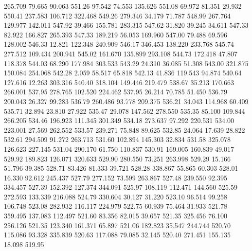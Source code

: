  265.709   79.665   90.063       551.26
  97.542   74.553  135.626       551.08
  69.972   81.351   29.932       550.41
 237.583  106.712  322.468       549.26
 279.346   34.179   71.787       548.99
 267.764  129.977  142.011       547.92
  39.466  155.781  283.315       547.62
  31.820   39.245   34.611       547.33
  82.922  166.827  265.393       547.33
 189.219   56.053  169.960       547.00
  79.488   69.596  128.002       546.33
  12.821  122.348  240.909       546.17
 346.453  138.220  233.768       545.74
 277.512  109.434  200.941       545.02
 161.670  135.899  293.108       544.73
 172.418   47.807  118.378       544.03
  68.290  177.984  303.533       543.29
  24.310   36.085   51.308       543.00
 321.875  150.084  254.068       542.28
   2.059   58.517   65.818       542.13
  41.836  119.543   94.874       540.64
 127.616   12.263  303.316       540.40
 318.104  149.446  219.479       538.67
  35.213  170.663  266.001       537.95
 278.765  102.520  224.462       537.95
  26.214   70.785   51.450       536.79
 200.043   26.327   99.283       536.79
 260.486   93.778  209.375       536.21
  34.043  114.968   60.409       535.71
  32.894   23.810   27.922       535.47
  29.078  147.562  278.550       535.35
  85.100  109.844  266.205       534.46
 196.923  111.345  301.349       534.18
 273.637   97.292  220.531       534.00
 223.001   27.569  262.552       533.57
 239.271   75.848   89.625       532.85
  24.064   17.639   28.822       532.61
 294.509   91.272  263.713       531.60
 102.894  145.303   32.834       531.58
 325.078  126.623  227.145       531.04
 290.170   61.750  110.837       530.91
 169.005  160.839   49.017       529.92
 189.823  126.071  320.633       529.90
 280.550   73.251  263.998       529.29
  15.166   51.796   39.385       528.71
  83.426   81.333   39.721       528.28
 338.867   55.865   60.303       528.01
  16.330   92.612  245.437       527.79
 277.152   73.599  263.867       527.48
 239.550   92.395  334.457       527.39
 152.392  127.374  344.091       525.97
 108.119  112.471  144.560       525.59
 272.593  133.339  216.088       524.79
 330.604   30.127   31.220       523.10
  96.514   99.258  106.748       523.08
 282.932  116.117  224.979       522.75
  60.939   75.464   31.933       521.78
 359.495  137.083  112.497       521.60
  83.356   82.015   39.657       521.35
 325.456   76.100  256.126       521.35
 123.340  161.371   65.897       521.06
 182.823   35.547  244.744       520.70
 115.086   93.328  335.839       520.63
 117.088   79.085   32.145       520.40
 271.451  155.135   18.098       519.95

